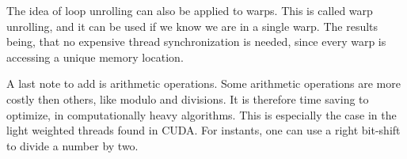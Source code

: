 The idea of loop unrolling can also be applied to warps. This is called warp unrolling, and it can be used if we know we are in a single warp. The results being, that no expensive thread synchronization is needed, since every warp is accessing a unique memory location.

A last note to add is arithmetic operations. Some arithmetic operations are more costly then others, like modulo and divisions. It is therefore time saving to optimize, in computationally heavy algorithms. This is especially the case in the light weighted threads found in CUDA. For instants, one can use a right bit-shift to divide a number by two.


\cleardoublepage
